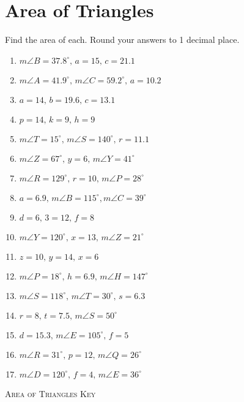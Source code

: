 \chapter{Area of Triangles}

Find the area of each. Round your answers to 1 decimal place.

\begin{enumerate}
	\item $m\angle B = 37.8^\circ, \, a = 15, \, c = 21.1$
    \item $m\angle A = 41.9^\circ, \, m\angle C = 59.2^\circ, \, a = 10.2$
    \item $a = 14, \, b = 19.6, \, c = 13.1$
    
    \item $p = 14, \, k = 9, \, h = 9$
    \item $m\angle T = 15^\circ, \, m\angle S = 140^\circ, \, r = 11.1$
    \item $m\angle Z = 67^\circ, \, y = 6, \, m\angle Y = 41^\circ$
    \item $m\angle R = 129^\circ, \, r = 10, \, m\angle P = 28^\circ$
    \item $a = 6.9, \, m\angle B = 115^\circ, m\angle C = 39^\circ$
    \item $d = 6, \, 3 = 12, \, f = 8$
    \item $m\angle Y = 120^\circ, \, x = 13, \, m\angle Z = 21^\circ$
    \item $z = 10, \, y = 14, \, x = 6$
    \item $m\angle P = 18^\circ, \, h = 6.9, \, m\angle H = 147^\circ$
    \item $m\angle S = 118^\circ, \, m\angle T = 30^\circ, \, s = 6.3$
    \item $r = 8, \, t = 7.5, \, m\angle S = 50^\circ$
    \item $d = 15.3, \, m\angle E = 105^\circ, \, f = 5$
    \item $m\angle R = 31^\circ, \, p = 12, \, m\angle Q = 26^\circ$
    \item $m\angle D = 120^\circ, \, f = 4, \, m\angle E = 36^\circ$
\end{enumerate}

\newpage

\textsc{Area of Triangles Key}

